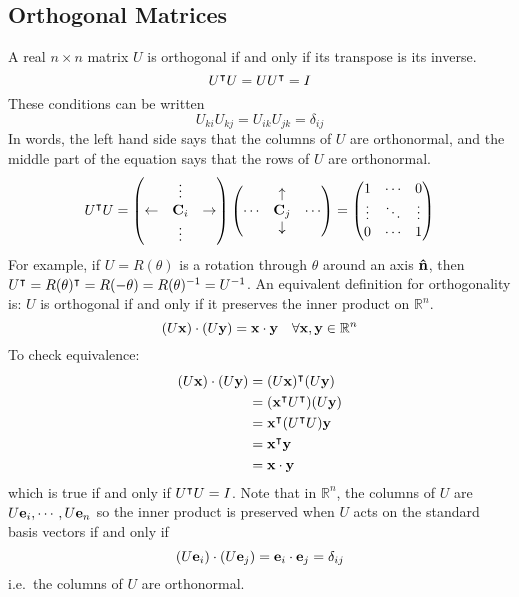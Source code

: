 \subsection{Orthogonal Matrices}
A real \(n \times n\) matrix \(U\) is orthogonal if and only if its transpose is its inverse.
\[
	U^\intercal U = UU^\intercal = I
\]
These conditions can be written
\[
	U_{ki}U_{kj} = U_{ik}U_{jk} = \delta_{ij}
\]
In words, the left hand side says that the columns of \(U\) are orthonormal, and the middle part of the equation says that the rows of \(U\) are orthonormal.
\[
	U^\intercal U = \begin{pmatrix}
		           & \vdots  &             \\
		\leftarrow & \vb C_i & \rightarrow \\
		           & \vdots  &
	\end{pmatrix}
	\begin{pmatrix}
		       & \uparrow   &        \\
		\cdots & \vb C_j    & \cdots \\
		       & \downarrow &
	\end{pmatrix}
	= \begin{pmatrix}
		1      & \cdots & 0      \\
		\vdots & \ddots & \vdots \\
		0      & \cdots & 1
	\end{pmatrix}
\]
For example, if \(U = R(\theta)\) is a rotation through \(\theta\) around an axis \(\vu{n}\), then \(U^\intercal = R(\theta)^\intercal = R(-\theta) = R(\theta)^{-1} = U^{-1}\).
An equivalent definition for orthogonality is: \(U\) is orthogonal if and only if it preserves the inner product on \(\mathbb R^n\).
\[
	(U\vb x)\cdot(U \vb y) = \vb x \cdot \vb y\quad \forall \vb x, \vb y \in \mathbb R^n
\]
To check equivalence:
\begin{align*}
	(U\vb x)\cdot(U \vb y) & = (U\vb x)^\intercal (U\vb y)             \\
	                       & = (\vb x^\intercal U^\intercal) (U\vb y) \\
	                       & = \vb x^\intercal (U^\intercal U) \vb y  \\
	                       & = \vb x^\intercal \vb y                   \\
	                       & = \vb x \cdot \vb y
\end{align*}
which is true if and only if \(U^\intercal U = I\).
Note that in \(\mathbb R^n\), the columns of \(U\) are \(U\vb e_i, \cdots, U\vb e_n\) so the inner product is preserved when \(U\) acts on the standard basis vectors if and only if
\[
	(U\vb e_i)\cdot(U\vb e_j) = \vb e_i \cdot \vb e_j = \delta_{ij}
\]
i.e.\ the columns of \(U\) are orthonormal.

